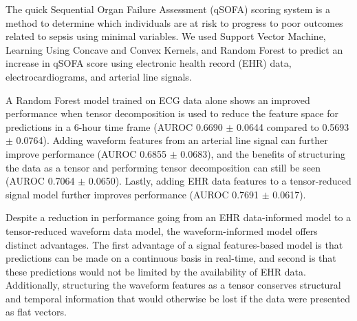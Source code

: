 
The quick Sequential Organ Failure Assessment (qSOFA) scoring system is a method to determine which individuals are at risk to progress to poor outcomes related to sepsis using minimal variables. We used Support Vector Machine, Learning Using Concave and Convex Kernels, and Random Forest to predict an increase in qSOFA score using electronic health record (EHR) data, electrocardiograms, and arterial line signals.

A Random Forest model trained on ECG data alone shows an improved performance when tensor decomposition is used to reduce the feature space for predictions in a 6-hour time frame (AUROC 0.6690 $\pm$ 0.0644 compared to 0.5693 $\pm$ 0.0764). Adding waveform features from an arterial line signal can further improve performance (AUROC 0.6855 $\pm$ 0.0683), and the benefits of structuring the data as a tensor and performing tensor decomposition can still be seen (AUROC 0.7064 $\pm$ 0.0650). Lastly, adding EHR data features to a tensor-reduced signal model further improves performance (AUROC 0.7691 $\pm$ 0.0617).

Despite a reduction in performance going from an EHR data-informed model to a tensor-reduced waveform data model, the waveform-informed model offers distinct advantages. The first advantage of a signal features-based model is that predictions can be made on a continuous basis in real-time, and second is that these predictions would not be limited by the availability of EHR data. Additionally, structuring the waveform features as a tensor conserves structural and temporal information that would otherwise be lost if the data were presented as flat vectors.
